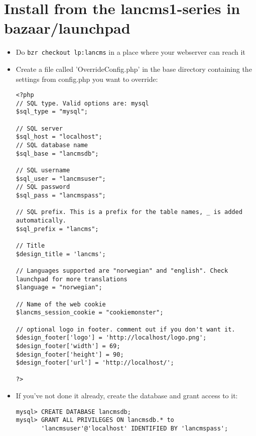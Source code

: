 \section{Install from the lancms1-series in bazaar/launchpad}
\begin{itemize}
\item Do \lstinline!bzr checkout lp:lancms! in a place where your webserver can reach it
\item Create a file called 'OverrideConfig.php' in the base directory containing the settings from config.php you want to override:
\begin{lstlisting}
<?php
// SQL type. Valid options are: mysql
$sql_type = "mysql";

// SQL server
$sql_host = "localhost";
// SQL database name
$sql_base = "lancmsdb";

// SQL username
$sql_user = "lancmsuser";
// SQL password
$sql_pass = "lancmspass";

// SQL prefix. This is a prefix for the table names, _ is added automatically.
$sql_prefix = "lancms";

// Title
$design_title = 'lancms';

// Languages supported are "norwegian" and "english". Check launchpad for more translations
$language = "norwegian";

// Name of the web cookie
$lancms_session_cookie = "cookiemonster";

// optional logo in footer. comment out if you don't want it.
$design_footer['logo'] = 'http://localhost/logo.png';
$design_footer['width'] = 69;
$design_footer['height'] = 90;
$design_footer['url'] = 'http://localhost/';

?>
\end{lstlisting}
\item If you've not done it already, create the database and grant access to
it:
\begin{lstlisting}
mysql> CREATE DATABASE lancmsdb;
mysql> GRANT ALL PRIVILEGES ON lancmsdb.* to
       'lancmsuser'@'localhost' IDENTIFIED BY 'lancmspass';
\end{lstlisting}

\end{itemize}
